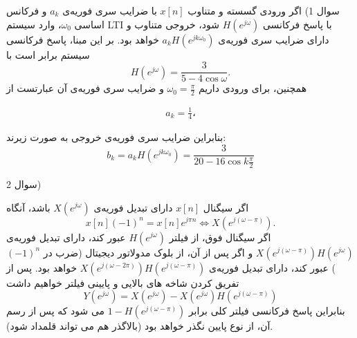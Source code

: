 \documentclass{article}
\newcommand{\qn}[1]{
\[
\begin{split}
#1
\end{split}
\]
}
\begin{document}
%

\large

سوال 1) اگر ورودی گسسته‌ و متناوب
$
x[n]
$
با ضرایب سری فوریه‌ی 
$
a_k
$
و فرکانس اساسی $\omega_0$، وارد سیستم LTI با پاسخ فرکانسی
$
H(e^{j\omega})
$
شود، خروجی متناوب و دارای ضرایب سری فوریه‌ی 
$
a_kH(e^{jk\omega_0})
$
خواهد بود. بر این مبنا، پاسخ فرکانسی سیستم برابر است با
$$
H(e^{j\omega})=\frac{3}{5-4\cos\omega}.
$$
همچنین، برای ورودی داریم
$
\omega_0=\frac{\pi}{2}
$
و ضرایب سری فوریه‌ی آن عبارتست از
\qn{
a_k=\frac{1}{4}،
}
بنابراین ضرایب سری فوریه‌ی خروجی به صورت زیرند:
$$
b_k=a_kH(e^{jk\omega_0})=\frac{3}{20-16\cos k\frac{\pi}{2}}
$$

سوال 2)

اگر سیگنال 
$
x[n]
$
دارای تبدیل فوریه‌ی 
$
X(e^{j\omega})
$
باشد، آنگاه
$$
x[n](-1)^n=x[n]e^{j\pi n}\iff X(e^{j(\omega-\pi)}).
$$
اگر سیگنال فوق، از فیلتر 
$
H(e^{j\omega})
$
عبور کند، دارای تبدیل فوریه‌ی 
$
X(e^{j(\omega-\pi)})H(e^{j\omega})
$
و اگر پس از آن، از بلوک مدولاتور دیجیتال (ضرب در $(-1)^n$) عبور کند، دارای تبدیل فوریه‌ی
$
X(e^{j(\omega-2\pi)})H(e^{j(\omega-\pi)})
$
خواهد بود. پس از تفریق کردن شاخه های بالایی و پایینی فیلتر خواهیم داشت
$$
Y(e^{j\omega})=X(e^{j\omega})-X(e^{j\omega})H(e^{j(\omega-\pi)})
$$
بنابراین پاسخ فرکانسی فیلتر کلی برابر 
$
1-H(e^{j(\omega-\pi)})
$
می شود که پس از رسم آن، از نوع پایین نگذر خواهد بود (بالاگذر هم می تواند قلمداد شود).
\end{document}
